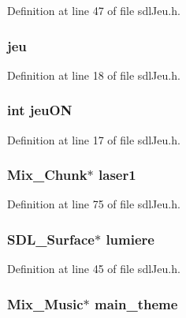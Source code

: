 Definition at line 47 of file sdl\-Jeu.\-h.

\hypertarget{structsdl_jeu_a56ca1ac56f66324ba9bc5868128ddb84}{
\subsubsection[{jeu}]{ jeu}}\label{structsdl_jeu_a56ca1ac56f66324ba9bc5868128ddb84}


Definition at line 18 of file sdl\-Jeu.\-h.

\hypertarget{structsdl_jeu_a52e5e34765d5dbac15d959dbaddf4e5e}{
\subsubsection[{jeu\-O\-N}]{\setlength{\rightskip}{0pt plus 5cm}int jeu\-O\-N}}\label{structsdl_jeu_a52e5e34765d5dbac15d959dbaddf4e5e}


Definition at line 17 of file sdl\-Jeu.\-h.

\hypertarget{structsdl_jeu_ac3dc104264d31879f76daa8cb4c61bca}{
\subsubsection[{laser1}]{\setlength{\rightskip}{0pt plus 5cm}Mix\-\_\-\-Chunk$\ast$ laser1}}\label{structsdl_jeu_ac3dc104264d31879f76daa8cb4c61bca}


Definition at line 75 of file sdl\-Jeu.\-h.

\hypertarget{structsdl_jeu_a18302ff4ecbc30500bf2638c3036aa8d}{
\subsubsection[{lumiere}]{\setlength{\rightskip}{0pt plus 5cm}S\-D\-L\-\_\-\-Surface$\ast$ lumiere}}\label{structsdl_jeu_a18302ff4ecbc30500bf2638c3036aa8d}


Definition at line 45 of file sdl\-Jeu.\-h.

\hypertarget{structsdl_jeu_af7321948c26bf773e1bbee605d15c2d7}{
\subsubsection[{main\-\_\-theme}]{\setlength{\rightskip}{0pt plus 5cm}Mix\-\_\-\-Music$\ast$ main\-\_\-theme}}\label{structsdl_jeu_af7321948c26bf773e1bbee605d15c2d7}


